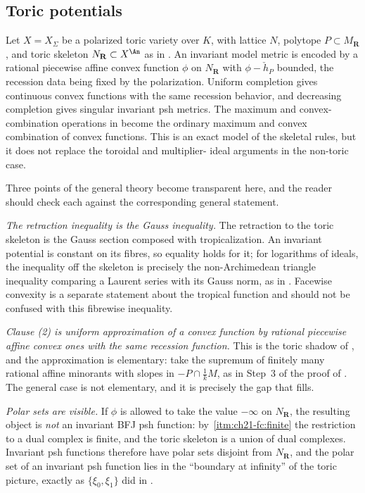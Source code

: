 \subsection{Toric potentials}
\label{sec:ch21-worked-toric}

\begin{example}
\label{ex:ch21-toric}
Let $X=X_\Sigma$ be a polarized toric variety over $K$, with lattice
$N$, polytope $P\subset M_{\mathbf R}$, and toric skeleton
$N_{\mathbf R}\subset X^{\An}$ as in .  An
invariant model metric is
encoded by a rational piecewise affine convex function $\phi$ on
$N_{\mathbf R}$ with $\phi-\check h_P$ bounded, the recession data being
fixed by the polarization.  Uniform completion gives continuous convex
functions with the same recession behavior, and decreasing completion gives
singular invariant psh metrics.  The maximum and convex-combination
operations in  become the ordinary
maximum and convex combination of convex functions.  This is an exact model
of the skeletal rules, but it does not replace the toroidal and multiplier-%
ideal arguments in the non-toric case.

Three points of the general theory become transparent here, and the reader
should check each against the corresponding general statement.

\emph{The retraction inequality is the Gauss inequality.}  The retraction
to the toric skeleton is the Gauss section composed with tropicalization.
An invariant potential is constant on its fibres, so equality holds for it;
for logarithms of ideals, the inequality off the skeleton is precisely the
non-Archimedean triangle inequality comparing a Laurent series with its
Gauss norm, as in .  Facewise convexity
is a separate statement about the tropical function and should not be
confused with this fibrewise inequality.

\emph{Clause \textup{(2)} is uniform approximation of a convex function by
rational piecewise affine convex ones with the same recession function.}
This is the toric shadow of , and the approximation
is elementary: take the supremum of finitely many rational affine minorants
with slopes in $-P\cap\tfrac1kM$, as in Step~3 of the proof of
.  The general case is not elementary, and it is
precisely the gap that  fills.

\emph{Polar sets are visible.}  If $\phi$ is allowed to take the value
$-\infty$ on $N_{\mathbf R}$, the resulting object is \emph{not} an
invariant BFJ psh function: by
\,\cref{itm:ch21-fc:finite} the
restriction to a dual complex is finite, and the toric skeleton is a union
of dual complexes.  Invariant psh functions therefore have polar sets
disjoint from $N_{\mathbf R}$, and the polar set of an invariant psh
function lies in the ``boundary at infinity'' of the toric picture, exactly
as $\{\xi_0,\xi_1\}$ did in .


\end{example}
